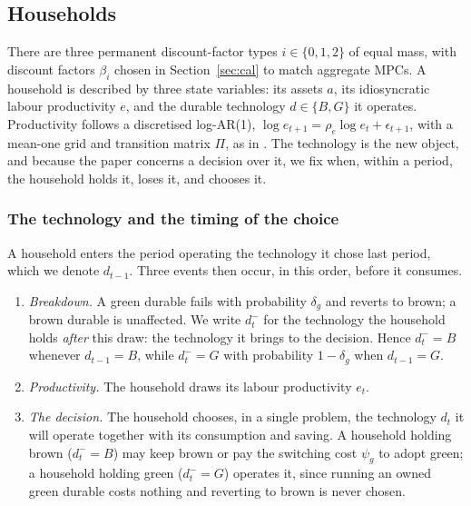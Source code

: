 \subsection{Households}\label{sec:hh}

There are three permanent discount-factor types $i\in\{0,1,2\}$ of equal mass, with
discount factors $\beta_i$ chosen in Section~\ref{sec:cal} to match aggregate MPCs.
A household is described by three state variables: its assets $a$, its idiosyncratic
labour productivity $e$, and the durable technology $d\in\{B, G\}$ it operates.
Productivity follows a discretised log-AR(1), $\log e_{t+1}=\rho_e\log e_t+\epsilon_{t+1}$, with a
mean-one grid and transition matrix $\Pi$, as in \citet{auclert2023energy}. The technology is
the new object, and because the paper concerns a decision over it, we fix when,
within a period, the household holds it, loses it, and chooses it.

\subsubsection{The technology and the timing of the choice}\label{sec:tech}

A household enters the period operating the technology it chose last period, which we
denote $d_{t-1}$. Three events then occur, in this order, before it consumes.

\begin{enumerate}
\item \emph{Breakdown.} A green durable fails with probability $\delta_g$ and reverts
to brown; a brown durable is unaffected. We write $d^-_t$ for the technology the
household holds \emph{after} this draw: the technology it brings to the decision.
Hence $d^-_t=B$ whenever $d_{t-1}=B$, while $d^-_t=G$ with probability $1-\delta_g$ when
$d_{t-1}=G$.
\item \emph{Productivity.} The household draws its labour productivity $e_t$.
\item \emph{The decision.} The household chooses, in a single problem, the
technology $d_t$ it will operate together with its consumption and saving. A household
holding brown ($d^-_t=B$) may keep brown or pay the switching cost $\psi_g$ to adopt
green; a household holding green ($d^-_t=G$) operates it, since running an owned green
durable costs nothing and reverting to brown is never chosen.
\end{enumerate}

